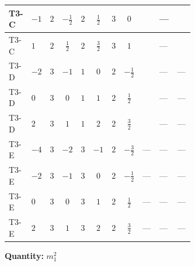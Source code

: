 \documentclass[8pt]{article}
\begin{document}
\begin{landscape}
\begin{longtable}{@{}llcccccc >{\raggedright\arraybackslash}p{0.21\linewidth} >{\raggedright\arraybackslash}p{0.21\linewidth} >{\raggedright\arraybackslash}p{0.21\linewidth}@{}}
\midrule
T3-C & $-1$ & $2$ & $-\frac{1}{2}$ & $2$ & $\frac{1}{2}$ & $3$ & $0$ & \scriptsize\adjustbox{max width=\linewidth}{$\begin{gathered} +4 {\lambda_{12}^{(1)}} {m_2^2}\end{gathered}$} & --- & \scriptsize\adjustbox{max width=\linewidth}{$\begin{gathered} -\frac{9 {g_2}^2 {m_1^2}}{2}\end{gathered}$} \\
\midrule
T3-C & $1$ & $2$ & $\frac{1}{2}$ & $2$ & $\frac{3}{2}$ & $3$ & $1$ & \scriptsize\adjustbox{max width=\linewidth}{$\begin{gathered} +4 {\lambda_{12}^{(1)}} {m_2^2}\end{gathered}$} & --- & \scriptsize\adjustbox{max width=\linewidth}{$\begin{gathered} -\frac{9 {g_2}^2 {m_1^2}}{2}\end{gathered}$} \\
\midrule
T3-D & $-2$ & $3$ & $-1$ & $1$ & $0$ & $2$ & $-\frac{1}{2}$ & \scriptsize\adjustbox{max width=\linewidth}{$\begin{gathered} +2 {\lambda_{12}^{(1)}} {m_2^2}\end{gathered}$} & --- & --- \\
\midrule
T3-D & $0$ & $3$ & $0$ & $1$ & $1$ & $2$ & $\frac{1}{2}$ & \scriptsize\adjustbox{max width=\linewidth}{$\begin{gathered} +2 {\lambda_{12}^{(1)}} {m_2^2}\end{gathered}$} & --- & --- \\
\midrule
T3-D & $2$ & $3$ & $1$ & $1$ & $2$ & $2$ & $\frac{3}{2}$ & \scriptsize\adjustbox{max width=\linewidth}{$\begin{gathered} +2 {\lambda_{12}^{(1)}} {m_2^2}\end{gathered}$} & --- & --- \\
\midrule
T3-E & $-4$ & $3$ & $-2$ & $3$ & $-1$ & $2$ & $-\frac{3}{2}$ & --- & --- & --- \\
\midrule
T3-E & $-2$ & $3$ & $-1$ & $3$ & $0$ & $2$ & $-\frac{1}{2}$ & --- & --- & --- \\
\midrule
T3-E & $0$ & $3$ & $0$ & $3$ & $1$ & $2$ & $\frac{1}{2}$ & --- & --- & --- \\
\midrule
T3-E & $2$ & $3$ & $1$ & $3$ & $2$ & $2$ & $\frac{3}{2}$ & --- & --- & --- \\
\midrule
\bottomrule
\end{longtable}
\clearpage
\noindent\textbf{Quantity: }$m_1^2$\par\smallskip

\end{landscape}
\end{document}
